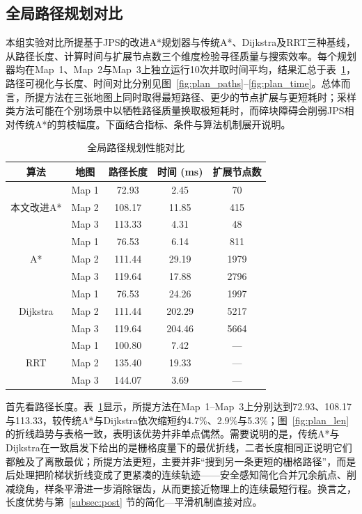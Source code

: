\documentclass[lettersize,journal]{IEEEtran}
\begin{document}
\subsection{全局路径规划对比}
\label{subsec:exp_plan}
本组实验对比所提基于JPS的改进A*规划器与传统A*、Dijkstra及RRT三种基线，从路径长度、计算时间与扩展节点数三个维度检验寻径质量与搜索效率。每个规划器均在Map~1、Map~2与Map~3上独立运行10次并取时间平均，结果汇总于表~\textcolor{blue}{\ref{tab:plan}}，路径可视化与长度、时间对比分别见图~\textcolor{blue}{\ref{fig:plan_paths}}--\textcolor{blue}{\ref{fig:plan_time}}。总体而言，所提方法在三张地图上同时取得最短路径、更少的节点扩展与更短耗时；采样类方法可能在个别场景中以牺牲路径质量换取极短耗时，而碎块障碍会削弱JPS相对传统A*的剪枝幅度。下面结合指标、条件与算法机制展开说明。

\begin{table}[!t]
\caption{全局路径规划性能对比}
\label{tab:plan}
\centering
\footnotesize
\begin{tabular}{ccccc}
\toprule
算法 & 地图 & 路径长度 & 时间 (ms) & 扩展节点数 \\
\midrule
\multirow{3}{*}{本文改进A*}
& Map 1 & 72.93 & 2.45 & 70 \\
& Map 2 & 108.17 & 11.85 & 415 \\
& Map 3 & 113.33 & 4.31 & 48 \\
\midrule
\multirow{3}{*}{A*}
& Map 1 & 76.53 & 6.14 & 811 \\
& Map 2 & 111.44 & 29.19 & 1979 \\
& Map 3 & 119.64 & 17.88 & 2796 \\
\midrule
\multirow{3}{*}{Dijkstra}
& Map 1 & 76.53 & 24.26 & 1997 \\
& Map 2 & 111.44 & 202.29 & 5217 \\
& Map 3 & 119.64 & 204.46 & 5664 \\
\midrule
\multirow{3}{*}{RRT}
& Map 1 & 100.80 & 7.42 & --- \\
& Map 2 & 135.40 & 19.33 & --- \\
& Map 3 & 144.07 & 3.69 & --- \\
\bottomrule
\end{tabular}
\end{table}

首先看路径长度。表~\textcolor{blue}{\ref{tab:plan}}显示，所提方法在Map~1--Map~3上分别达到72.93、108.17与113.33，较传统A*与Dijkstra依次缩短约4.7\%、2.9\%与5.3\%；图~\textcolor{blue}{\ref{fig:plan_len}}的折线趋势与表格一致，表明该优势并非单点偶然。需要说明的是，传统A*与Dijkstra在一致启发下给出的是栅格度量下的最优折线，二者长度相同正说明它们都触及了离散最优；所提方法更短，主要并非“搜到另一条更短的栅格路径”，而是后处理把阶梯状折线变成了更紧凑的连续轨迹——安全感知简化合并冗余航点、削减绕角，样条平滑进一步消除锯齿，从而更接近物理上的连续最短行程。换言之，长度优势与第~\textcolor{blue}{\ref{subsec:post}} 节的简化—平滑机制直接对应。
\end{document}
